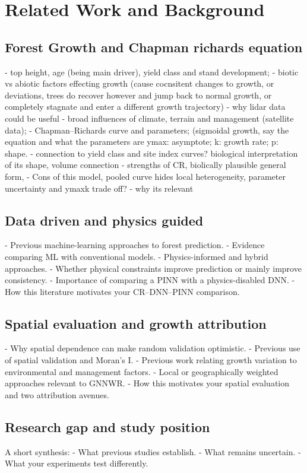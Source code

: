 \documentclass[11pt,a4paper]{report}
\begin{document}
\chapter{Related Work and Background} \label{chap:related_work_and_background}

\section{Forest Growth and Chapman richards equation}
- top height, age (being main driver), yield class and stand development;
- biotic vs abiotic factors effecting growth (cause cocnsitent changes to growth, or deviations, trees do recover however and jump back to normal growth, or completely stagnate and enter a different growth trajectory) 
- why lidar data could be useful 
- broad influences of climate, terrain and management (satellite data);
- Chapman–Richards curve and parameters; (sigmoidal growth, say the equation and what the parameters are ymax: asymptote; k: growth rate; p: shape.
- connection to yield class and site index curves? biological interpretation of its shape, volume connection 
- strengths of CR, biolically plausible general form, 
- Cons of this model, pooled curve hides local heterogeneity, parameter uncertainty and ymaxk trade off? 
- why its relevant 


\section{Data driven and physics guided}
- Previous machine-learning approaches to forest prediction.
- Evidence comparing ML with conventional models.
- Physics-informed and hybrid approaches.
- Whether physical constraints improve prediction or mainly improve consistency.
- Importance of comparing a PINN with a physics-disabled DNN.
- How this literature motivates your CR–DNN–PINN comparison.


\section{Spatial evaluation and growth attribution}
- Why spatial dependence can make random validation optimistic.
- Previous use of spatial validation and Moran’s I.
- Previous work relating growth variation to environmental and management factors.
- Local or geographically weighted approaches relevant to GNNWR.
- How this motivates your spatial evaluation and two attribution avenues.


\section{Research gap and study position}
A short synthesis:
- What previous studies establish.
- What remains uncertain.
- What your experiments test differently.




\end{document}
